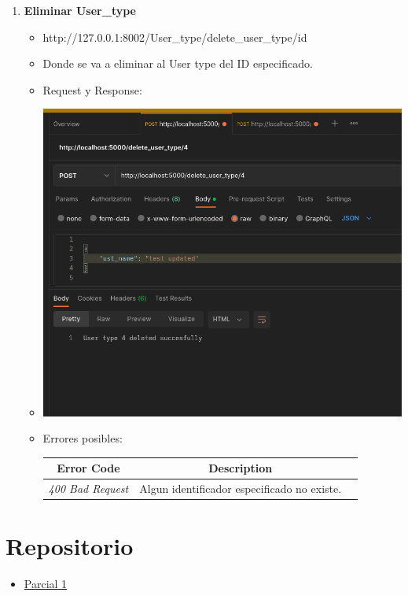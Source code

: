\documentclass{article}
\begin{document}
\begin{enumerate}
    \item \textbf{Eliminar User\_type}
    \begin{itemize}
        \item http://127.0.0.1:8002/User\_type/delete\_user\_type/id
        \item Donde se va a eliminar al User type del ID especificado.
        \item Request y Response:
        \item \includegraphics[scale=.5]{assets/user_type/delete_user_type.png}
        \item Errores posibles: \begin{table}[H] \centering
        \begin{tabular}{|c|c|l|} \hline \textbf{Error Code} &
        \textbf{Description} \\ \hline \textit{400 Bad Request} & Algun
        identificador especificado no existe. \\ \hline \end{tabular}
        \end{table}
    \end{itemize}
\end{enumerate}

%

\nocite{*}

%

\section{Repositorio}\label{sec:Repositorio}
\begin{itemize}
    \item {\color{blue}\href{https://github.com/pintovillamar/software-construction/tree/main/project2}{Parcial 1}}
\end{itemize}
\end{document}
